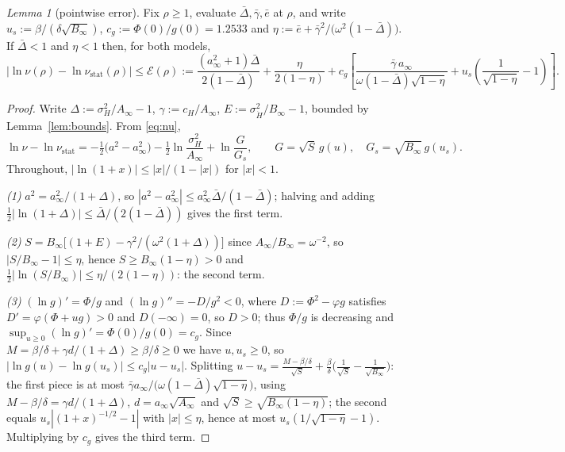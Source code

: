 \documentclass[11pt,a4paper]{article}
\theoremstyle{remark}\newtheorem{remark}[proposition]{Remark}
\newtheorem{lemma}{Lemma}[section]
\newcommand{\Ain}{A_{\infty}}
\newcommand{\Bin}{B_{\infty}}
\newcommand{\nustat}{\nu_{\mathrm{stat}}}
\begin{document}
\begin{lemma}[pointwise error]\label{lem:point}
Fix $\rho\ge1$, evaluate $\bar\Delta,\bar\gamma,\bar e$ at $\rho$, and write
$u_s:=\beta/(\delta\sqrt{\Bin})$, $c_g:=\Phi(0)/g(0)=1.2533$ and
$\eta:=\bar e+\bar\gamma^{2}/\bigl(\omega^{2}(1-\bar\Delta)\bigr)$.
If $\bar\Delta<1$ and $\eta<1$ then, for both models,
\begin{equation}
\bigl|\ln\nu(\rho)-\ln\nustat(\rho)\bigr|\le\mathcal{E}(\rho):=
\frac{(a_\infty^{2}+1)\bar\Delta}{2(1-\bar\Delta)}
+\frac{\eta}{2(1-\eta)}
+c_g\!\left[\frac{\bar\gamma\,a_\infty}{\omega(1-\bar\Delta)\sqrt{1-\eta}}
+u_s\!\left(\frac{1}{\sqrt{1-\eta}}-1\right)\right].
\label{eq:point}
\end{equation}
\end{lemma}
\begin{proof}
Write $\Delta:=\sigma_H^{2}/\Ain-1$, $\gamma:=c_H/\Ain$,
$E:=\sigma_{\dot H}^{2}/\Bin-1$, bounded by Lemma~\ref{lem:bounds}. From
\eqref{eq:nu},
\[
\ln\nu-\ln\nustat=-\tfrac12\bigl(a^{2}-a_\infty^{2}\bigr)-\tfrac12\ln\frac{\sigma_H^{2}}{\Ain}
+\ln\frac{G}{G_s},\qquad G=\sqrt S\,g(u),\quad G_s=\sqrt{\Bin}\,g(u_s).
\]
Throughout, $|\ln(1+x)|\le|x|/(1-|x|)$ for $|x|<1$.

\emph{(1)} $a^{2}=a_\infty^{2}/(1+\Delta)$, so
$|a^{2}-a_\infty^{2}|\le a_\infty^{2}\bar\Delta/(1-\bar\Delta)$; halving and adding
$\tfrac12|\ln(1+\Delta)|\le\bar\Delta/(2(1-\bar\Delta))$ gives the first term.

\emph{(2)} $S=\Bin\bigl[(1+E)-\gamma^{2}/(\omega^{2}(1+\Delta))\bigr]$ since
$\Ain/\Bin=\omega^{-2}$, so $|S/\Bin-1|\le\eta$, hence $S\ge\Bin(1-\eta)>0$ and
$\tfrac12|\ln(S/\Bin)|\le\eta/(2(1-\eta))$: the second term.

\emph{(3)} $(\ln g)'=\Phi/g$ and $(\ln g)''=-D/g^{2}<0$, where
$D:=\Phi^{2}-\varphi g$ satisfies $D'=\varphi(\Phi+ug)>0$ and $D(-\infty)=0$, so
$D>0$; thus $\Phi/g$ is decreasing and $\sup_{u\ge0}(\ln g)'=\Phi(0)/g(0)=c_g$. Since
$M=\beta/\delta+\gamma d/(1+\Delta)\ge\beta/\delta\ge0$ we have $u,u_s\ge0$, so
$|\ln g(u)-\ln g(u_s)|\le c_g|u-u_s|$. Splitting
$u-u_s=\frac{M-\beta/\delta}{\sqrt S}+\frac{\beta}{\delta}\bigl(\frac{1}{\sqrt S}-\frac{1}{\sqrt{\Bin}}\bigr)$:
the first piece is at most
$\bar\gamma a_\infty/\bigl(\omega(1-\bar\Delta)\sqrt{1-\eta}\bigr)$, using
$M-\beta/\delta=\gamma d/(1+\Delta)$, $d=a_\infty\sqrt{\Ain}$ and
$\sqrt S\ge\sqrt{\Bin(1-\eta)}$; the second equals $u_s|(1+x)^{-1/2}-1|$ with
$|x|\le\eta$, hence at most $u_s(1/\sqrt{1-\eta}-1)$. Multiplying by $c_g$ gives the
third term.
\end{proof}
\end{document}

